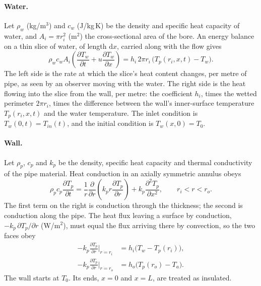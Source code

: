 \documentclass[a4paper,justified]{tufte-handout}
\newcommand{\dd}{\mathrm{d}}
\begin{document}
\paragraph{Water.} Let $\rho_w$ (kg/m$^3$) and $c_w$ (J/kg\,K) be the density
and specific heat capacity of water, and $A_i=\pi r_i^2$ (m$^2$) the
cross-sectional area of the bore. An energy balance on a thin slice of water,
of length $\dd x$, carried along with the flow gives
\begin{equation}
  \rho_w c_w A_i\left(\frac{\partial T_w}{\partial t}+u\frac{\partial T_w}{\partial x}\right)
  = h_i\, 2\pi r_i\,\bigl(T_p(r_i,x,t)-T_w\bigr).
  \label{eq:water}
\end{equation}
The left side is the rate at which the slice's heat content changes, per metre
of pipe, as seen by an observer moving with the water. The right side is the
heat flowing into the slice from the wall, per metre: the coefficient $h_i$,
times the wetted perimeter $2\pi r_i$, times the difference between the wall's
inner-surface temperature $T_p(r_i,x,t)$ and the water temperature. The inlet
condition is $T_w(0,t)=T_{in}(t)$, and the initial condition is
$T_w(x,0)=T_0$.

\paragraph{Wall.} Let $\rho_p$, $c_p$ and $k_p$ be the density, specific heat
capacity and thermal conductivity of the pipe material. Heat conduction in an axially symmetric annulus obeys
\begin{equation}
  \rho_p c_p \frac{\partial T_p}{\partial t}
  = \frac{1}{r}\frac{\partial}{\partial r}\!\left(k_p r \frac{\partial T_p}{\partial r}\right)
  + k_p\frac{\partial^2 T_p}{\partial x^2},
  \qquad r_i<r<r_o .
  \label{eq:wall}
\end{equation}
The first term on the right is conduction through the thickness; the second is
conduction along the pipe. The heat flux leaving a surface by conduction,
$-k_p\,\partial T_p/\partial r$ (W/m$^2$), must equal the flux arriving there by
convection, so the two faces obey
\begin{align}
  -k_p\frac{\partial T_p}{\partial r}\Big|_{r=r_i} &= h_i\bigl(T_w-T_p(r_i)\bigr), \\
  -k_p\frac{\partial T_p}{\partial r}\Big|_{r=r_o} &= h_o\bigl(T_p(r_o)-T_a\bigr).
\end{align}
The wall starts at $T_0$. Its ends, $x=0$ and $x=L$, are treated as insulated.
\end{document}
